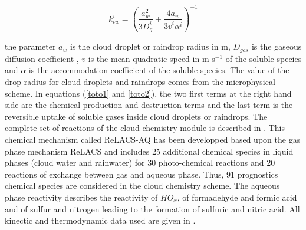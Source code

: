 \begin{equation}
k_{tw}^{i}=\left ( \frac{a_{w}^{2}}{3D_{g}^{i}}+\frac{4a_{w}}{3\overline{v}^{i}\alpha^{i}} \right )^{-1}
\end{equation}

the parameter $a_{w}$ is the cloud droplet or raindrop radius in m, $D_{gas}$ is the gaseous diffusion coefficient , $\overline{v}$ is the mean quadratic speed in m s$^{-1}$ of the soluble species and $\alpha$ is the accommodation coefficient of the soluble species. The value of the drop radius for cloud droplets and raindrops comes from the microphysical scheme. 
In equations (\ref{toto1} and \ref{toto2}), the two first terms at the right hand side are the chemical production and destruction terms and the last term is the reversible uptake of soluble gases inside cloud droplets or raindrops. The complete set of reactions of the cloud chemistry module is described in \citet{Leriche2013}. This chemical mechanism called ReLACS-AQ has been developped based upon the gas phase mechanism ReLACS \citep{Crassier2000} and includes 25 additional chemical species in liquid phases (cloud water and rainwater) for 30 photo-chemical reactions and 20 reactions of exchange between gas and aqueous phase. Thus, 91 prognostics chemical species are considered in the cloud chemistry scheme. The aqueous phase reactivity describes the reactivity of $HO_{x}$, of formadehyde and formic acid and of sulfur and nitrogen leading to the formation of sulfuric and nitric acid. All kinectic and thermodynamic data used are given in \citet{Leriche2013}.

